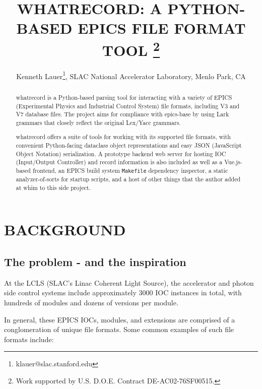 \documentclass[letter,
               keeplastbox,   %
               ]{jacow}
\begin{document}
\title{WHATRECORD: A PYTHON-BASED EPICS FILE FORMAT TOOL
\thanks{Work supported by U.S. D.O.E. Contract DE-AC02-76SF00515.}}
\author{Kenneth Lauer\thanks{klauer@slac.stanford.edu}, SLAC National Accelerator Laboratory, Menlo Park, CA }
	
\maketitle

%
\begin{abstract}
  whatrecord is a Python-based parsing tool for interacting with a variety of
  EPICS (Experimental Physics and Industrial Control System) file formats,
  including V3 and V7 database files. The project aims for compliance with
  epics-base by using Lark\cite{lark} grammars that closely reflect the
  original Lex/Yacc grammars. 

  whatrecord offers a suite of tools for working with its supported file
  formats, with convenient Python-facing dataclass object representations and
  easy JSON (JavaScript Object Notation) serialization. A prototype backend web
  server for hosting IOC (Input/Output Controller) and record information is
  also included as well as a Vue.js-based frontend, an EPICS build system
  \verb_Makefile_ dependency inspector, a static analyzer-of-sorts for startup
  scripts, and a host of other things that the author added at whim to this
  side project.
\end{abstract}

\section{BACKGROUND}

\subsection{The problem - and the inspiration}

At the LCLS (SLAC's Linac Coherent Light Source), the accelerator and photon
side control systems include approximately 3000 IOC instances in total, with
hundreds of modules and dozens of versions per module.

In general, these EPICS IOCs, modules, and extensions are comprised of a
conglomeration of unique file formats. Some common examples of such file
formats include:
\end{document}
